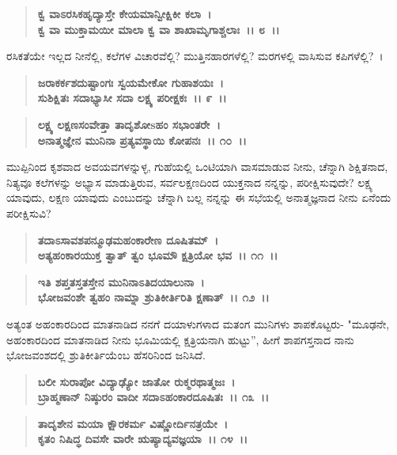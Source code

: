 \begin{verse}
\textbf{ಕ್ವ ವಾಽರಸಿಕಹೃದ್ಯಾಸ್ತೇ ಕೇಯಮಾನ್ವೀಕ್ಷಿಕೀ ಕಲಾ~।}\\\textbf{ಕ್ವ ವಾ ಮುಕ್ತಾಮಯೀ ಮಾಲಾ ಕ್ವ ವಾ ಶಾಖಾಮೃಗಾಶ್ಚಲಾಃ~।। ೮~।। }
\end{verse}

ರಸಿಕತೆಯೇ ಇಲ್ಲದ ನೀನೆಲ್ಲಿ, ಕಲೆಗಳ ವಿಚಾರವೆಲ್ಲಿ? ಮುತ್ತಿನಹಾರಗಳೆಲ್ಲಿ? ಮರಗಳಲ್ಲಿ ವಾಸಿಸುವ ಕಪಿಗಳೆಲ್ಲಿ?~।

\begin{verse}
\textbf{ಜರಾಕರ್ಕಶದುಷ್ಟಾಂಗಃ ಸ್ವಯಮೇಕೋ ಗುಹಾಶಯಃ~।}\\\textbf{ಸುಶಿಕ್ಷಿತಃ ಸದಾಭ್ಯಾಸೀ ಸದಾ ಲಕ್ಷ್ಯ ಪರೀಕ್ಷಕಃ~।। ೯~।। }
\end{verse}

\begin{verse}
\textbf{ಲಕ್ಷ್ಯ ಲಕ್ಷಣಸಂವೇತ್ತಾ ತಾದೃಶೋsಹಂ ಸಭಾಂತರೇ~।}\\\textbf{ಅನಾತ್ಮಜ್ಞೇನ ಮುನಿನಾ ಪ್ರತ್ಯವಸ್ಥಾಯಿ ಕೋಪನಃ~।। ೧೦~।।}
\end{verse}

ಮುಪ್ಪಿನಿಂದ ಕೃಶವಾದ ಅವಯವಗಳನ್ನುಳ್ಳ, ಗುಹೆಯಲ್ಲಿ ಒಂಟಿಯಾಗಿ ವಾಸಮಾಡುವ ನೀನು, ಚೆನ್ನಾಗಿ ಶಿಕ್ಷಿತನಾದ, ನಿತ್ಯವೂ ಕಲೆಗಳನ್ನು ಅಭ್ಯಾಸ ಮಾಡುತ್ತಿರುವ, ಸರ್ವಲಕ್ಷಣದಿಂದ ಯುಕ್ತನಾದ ನನ್ನನ್ನು, ಪರೀಕ್ಷಿಸುವುದೇ? ಲಕ್ಷ್ಯ ಯಾವುದು, ಲಕ್ಷಣ ಯಾವುದು ಎಂಬುದನ್ನು ಚೆನ್ನಾಗಿ ಬಲ್ಲ ನನ್ನನ್ನು ಈ ಸಭೆಯಲ್ಲಿ ಅನಾತ್ಮಜ್ಞನಾದ ನೀನು ಏನೆಂದು ಪರೀಕ್ಷಿಸುವಿ?

\begin{verse}
\textbf{ತದಾಽಸಾವಶಪನ್ಮೂಢಮಹಂಕಾರೇಣ ದೂಷಿತಮ್~।}\\\textbf{ಅತ್ಯಹಂಕಾರಯುಕ್ತ ತ್ವಾತ್ ತ್ವಂ ಭೂಮೌ ಕ್ಷತ್ರಿಯೋ ಭವ~।। ೧೧~।।} 
\end{verse}

\begin{verse}
\textbf{ಇತಿ ಶಪ್ತತಸ್ತತಸ್ತೇನ ಮುನಿನಾಽತಿದಯಾಲುನಾ~।}\\\textbf{ಭೋಜವಂಶೇ ತ್ವಹಂ ನಾಮ್ನಾ ಶ್ರುತಿಕೀರ್ತಿರಿತಿ ಕ್ಷಣಾತ್~।। ೧೨~।।} 
\end{verse}

ಅತ್ಯಂತ ಅಹಂಕಾರದಿಂದ ಮಾತನಾಡಿದ ನನಗೆ ದಯಾಳುಗಳಾದ ಮತಂಗ ಮುನಿಗಳು ಶಾಪಕೊಟ್ಟರು- "ಮೂಢನೇ, ಅಹಂಕಾರದಿಂದ ಮಾತನಾಡಿದ ನೀನು ಭೂಮಿಯಲ್ಲಿ ಕ್ಷತ್ರಿಯನಾಗಿ ಹುಟ್ಟು”, ಹೀಗೆ ಶಾಪಗಸ್ತನಾದ ನಾನು ಭೋಜವಂಶದಲ್ಲಿ ಶ್ರುತಿಕೀರ್ತಿಯೆಂಬ ಹೆಸರಿನಿಂದ ಜನಿಸಿದೆ.

\begin{verse}
\textbf{ಬಲೀ ಸುರಾಪೋ ವಿದ್ಯಾಢ್ಯೋ ಜಾತೋ ರುಕ್ಮರಥಾತ್ಮಜಃ~।}\\\textbf{ಬ್ರಾಹ್ಮಣಾನ್ ನಿಷ್ಠುರಂ ವಾದೀ ಸದಾಽಹಂಕಾರದೂಷಿತಃ~।। ೧೩~।। }
\end{verse}

\begin{verse}
\textbf{ತಾದೃಶೇನ ಮಯಾ ಕ್ಷೌರಕರ್ಮ ವಿಷ್ಣೋರ್ದಿನತ್ರಯೇ~।}\\\textbf{ಕೃತಂ ನಿಷಿದ್ಧ ದಿವಸೇ ವಾರೇ ಋಷ್ಯಾದ್ಯವಜ್ಞಯಾ~।। ೧೪~।।}
\end{verse}

